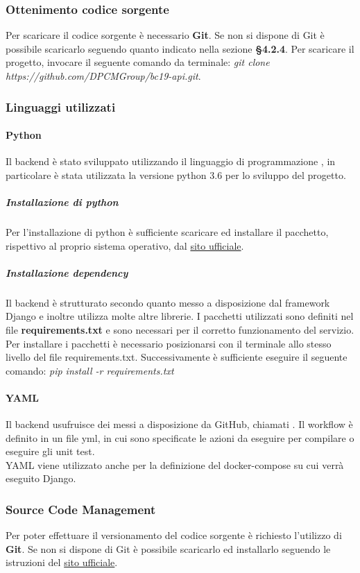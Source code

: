 \subsubsection{Ottenimento codice sorgente}
Per scaricare il codice sorgente è necessario \textbf{Git}. Se non si dispone di Git è possibile scaricarlo seguendo quanto indicato nella sezione \textbf{§4.2.4}. Per scaricare il progetto, invocare il seguente comando da terminale: \textit{git clone https://github.com/DPCMGroup/bc19-api.git}.

\subsubsection{Linguaggi utilizzati}
\paragraph{Python}
Il backend è stato sviluppato utilizzando il linguaggio di programmazione , in particolare è stata utilizzata la versione python 3.6 per lo sviluppo del progetto.

\subparagraph{Installazione di python}
Per l'installazione di python è sufficiente scaricare ed installare il pacchetto, rispettivo al proprio sistema operativo, dal \href{https://www.python.org/downloads/}{sito ufficiale}.

\subparagraph{Installazione dependency}
Il backend è strutturato secondo quanto messo a disposizione dal framework Django e inoltre utilizza molte altre librerie. I pacchetti utilizzati sono definiti nel file \textbf{requirements.txt} e sono necessari per il corretto funzionamento del servizio.\\
Per installare i pacchetti è necessario posizionarsi con il terminale allo stesso livello del file requirements.txt. Successivamente è sufficiente eseguire il seguente comando: \textit{pip install -r requirements.txt}

\paragraph{YAML}
Il backend usufruisce dei  messi a disposizione da GitHub, chiamati . Il workflow è definito in un file yml, in cui sono specificate le azioni da eseguire per compilare o eseguire gli unit test.
\\YAML viene utilizzato anche per la definizione del docker-compose su cui verrà eseguito Django.

\subsubsection{Source Code Management}
Per poter effettuare il versionamento del codice sorgente è richiesto l'utilizzo di \textbf{Git}. Se non si dispone di Git è possibile scaricarlo ed installarlo seguendo le istruzioni del \href{https://git-scm.com/downloads}{sito ufficiale}.

